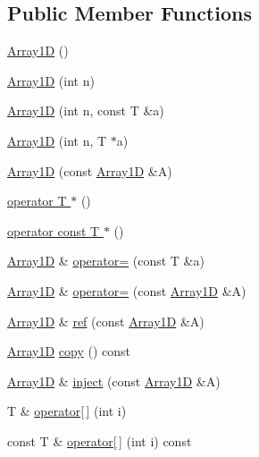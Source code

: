 \subsection*{Public Member Functions}
\begin{DoxyCompactItemize}
\item 
\hyperlink{classTNT_1_1Array1D_a63efd23cd38d37d427702d5e1d2b23d3}{Array1\-D} ()
\item 
\hyperlink{classTNT_1_1Array1D_a97139e0062704ec12f76c51a4f8527f1}{Array1\-D} (int n)
\item 
\hyperlink{classTNT_1_1Array1D_adfcc1fa364923b4fccc20b5e2df39902}{Array1\-D} (int n, const T \&a)
\item 
\hyperlink{classTNT_1_1Array1D_a1db0c6d3a77baacb01cd6fd89e86f342}{Array1\-D} (int n, T $\ast$a)
\item 
\hyperlink{classTNT_1_1Array1D_a9d1bf5c40c8d7a591d20134ff5561817}{Array1\-D} (const \hyperlink{classTNT_1_1Array1D}{Array1\-D} \&A)
\item 
\hyperlink{classTNT_1_1Array1D_a1755e33bccb4daf46febd377cdcf43a1}{operator T $\ast$} ()
\item 
\hyperlink{classTNT_1_1Array1D_a6092726d1cea6451128467064a2c31cb}{operator const T $\ast$} ()
\item 
\hyperlink{classTNT_1_1Array1D}{Array1\-D} \& \hyperlink{classTNT_1_1Array1D_aaf1264253a6e721f065287a7a2405764}{operator=} (const T \&a)
\item 
\hyperlink{classTNT_1_1Array1D}{Array1\-D} \& \hyperlink{classTNT_1_1Array1D_afa653e3563d08d4abc0a6f186e561b0e}{operator=} (const \hyperlink{classTNT_1_1Array1D}{Array1\-D} \&A)
\item 
\hyperlink{classTNT_1_1Array1D}{Array1\-D} \& \hyperlink{classTNT_1_1Array1D_a908c5381a74bcb1f50d47b37327265ae}{ref} (const \hyperlink{classTNT_1_1Array1D}{Array1\-D} \&A)
\item 
\hyperlink{classTNT_1_1Array1D}{Array1\-D} \hyperlink{classTNT_1_1Array1D_a6b9314ad3f1b8781c56447501a36809d}{copy} () const 
\item 
\hyperlink{classTNT_1_1Array1D}{Array1\-D} \& \hyperlink{classTNT_1_1Array1D_a214990ddf4bcb1541bcd18cbfdeb0b25}{inject} (const \hyperlink{classTNT_1_1Array1D}{Array1\-D} \&A)
\item 
T \& \hyperlink{classTNT_1_1Array1D_a16850fa648cd1bf8144df68e1418b3ee}{operator\mbox{[}$\,$\mbox{]}} (int i)
\item 
const T \& \hyperlink{classTNT_1_1Array1D_aa053e4b67792ebb4060f1bd58a8f2e67}{operator\mbox{[}$\,$\mbox{]}} (int i) const 

\end{DoxyCompactItemize}
